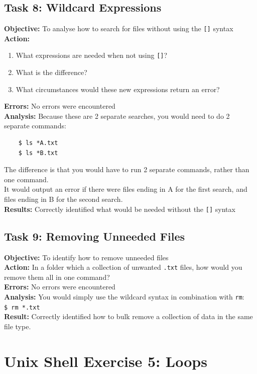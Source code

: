 \documentclass{article}
\begin{document}
\subsection{Task 8: Wildcard Expressions}
%
\textbf{Objective:} To analyse how to search for files without using the \texttt{[]} syntax
\textbf{Action:}
\begin{enumerate}
    \item What expressions are needed when not using \texttt{[]}?
    \item What is the difference?
    \item What circumstances would these new expressions return an error?
\end{enumerate}
\textbf{Errors:} No errors were encountered\\
\textbf{Analysis:} Because these are 2 separate searches, you would need to do 2 separate commands:
\begin{verbatim}
    $ ls *A.txt
    $ ls *B.txt
\end{verbatim}
The difference is that you would have to run 2 separate commands, rather than one command.\\
It would output an error if there were files ending in A for the first search, and files ending in B for the second search.\\
\textbf{Results:} Correctly identified what would be needed without the \texttt{[]} syntax
%
\subsection{Task 9: Removing Unneeded Files}
%
\textbf{Objective:} To identify how to remove unneeded files\\
\textbf{Action:} In a folder which a collection of unwanted \texttt{.txt} files, how would you remove them all in one command?\\
\textbf{Errors:} No errors were encountered\\
\textbf{Analysis:} You would simply use the wildcard syntax in combination with \texttt{rm}:\\
\verb|$ rm *.txt|\\
\textbf{Result:} Correctly identified how to bulk remove a collection of data in the same file type.
\section{Unix Shell Exercise 5: Loops}
%
\end{document}
